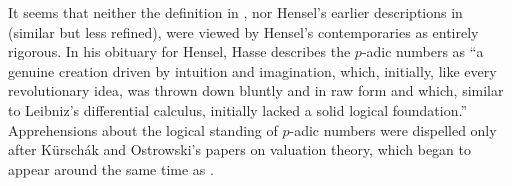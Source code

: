 \begin{rmk} 
It seems that neither the definition in \cite{hensel13}, nor Hensel's earlier descriptions in \cite{hensel04, hensel08} (similar but less refined), were viewed by Hensel's contemporaries as entirely rigorous. In his obituary \cite{hasse} for Hensel, Hasse describes the $p$-adic numbers as ``a genuine creation driven by intuition and imagination, which, initially, like every revolutionary idea, was thrown down bluntly and in raw form and which, similar to Leibniz's differential calculus, initially lacked a solid logical foundation.'' Apprehensions about the logical standing of $p$-adic numbers were dispelled only after Kürschák and Ostrowski's papers on valuation theory, which began to appear around the same time as \cite{hensel13}.
\end{rmk}


